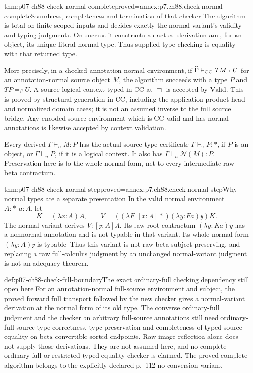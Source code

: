 \begin{hbtheorem}{thm:p07-ch88-check-normal-complete}{proved=annex:p7.ch88.check-normal-complete}{Soundness, completeness and termination of that checker}
The algorithm is total on finite scoped inputs and decides exactly the
normal variant's validity and typing judgments. On success it constructs
an actual derivation and, for an object, its unique literal normal type.
Thus supplied-type checking is equality with that returned type.

More precisely, in a checked annotation-normal environment, if
\(\widehat\Gamma\vdash_{\rm CC}TM:U\) for an annotation-normal
source object \(M\), the algorithm succeeds with a type \(P\) and
\(TP=_\beta U\). A source logical context typed in CC at \(\Box\)
is accepted by \(\mathrm{Valid}\). This is proved by structural
generation in CC, including the application product-head and normalized
domain cases; it is not an assumed inverse to the full source bridge.
Any encoded source environment which is CC-valid and has normal
annotations is likewise accepted by context validation.

Every derived \(\Gamma\vdash_n M:P\) has the actual source type
certificate \(\Gamma\vdash_n P:\ast\), if \(P\) is an object,
or \(\Gamma\vdash_n P\), if it is a logical context. It also has
\(\Gamma\vdash_n\mathcal N(M):P\). Preservation here is to the
whole normal form, not to every intermediate raw beta contractum.
\end{hbtheorem}

\begin{hbtheorem}{thm:p07-ch88-check-normal-step}{proved=annex:p7.ch88.check-normal-step}{Why normal types are a separate presentation}
In the valid normal environment \(A:\ast,a:A\), let
\[
 K=(\lambda x:A)A,\qquad
 V=((\lambda F:[x:A]\ast)(\lambda y:Fa)y)K.
\]
The normal variant derives \(V:[y:A]A\). Its raw root contractum
\((\lambda y:Ka)y\) has a nonnormal annotation and is not typable
in that variant. Its whole normal form \((\lambda y:A)y\) is typable.
Thus this variant is not raw-beta subject-preserving, and replacing a
raw full-calculus judgment by an unchanged normal-variant judgment is
not an adequacy theorem.
\end{hbtheorem}

\begin{proofboundary}{def:p07-ch88-check-full-boundary}{The exact ordinary-full checking dependency still open here}
For an annotation-normal full-source environment and subject, the proved
forward full transport followed by the new checker gives a normal-variant
derivation at the normal form of its old type. The converse ordinary-full
judgment and the checker on arbitrary full-source annotations still need
ordinary-full source type correctness, type preservation and completeness of typed source
equality on beta-convertible sorted endpoints. Raw image reflection alone
does not supply those derivations. They are not assumed here, and no
complete ordinary-full or restricted typed-equality checker is claimed.
The proved complete algorithm belongs to the explicitly declared p.~112
no-conversion variant.
\end{proofboundary}
